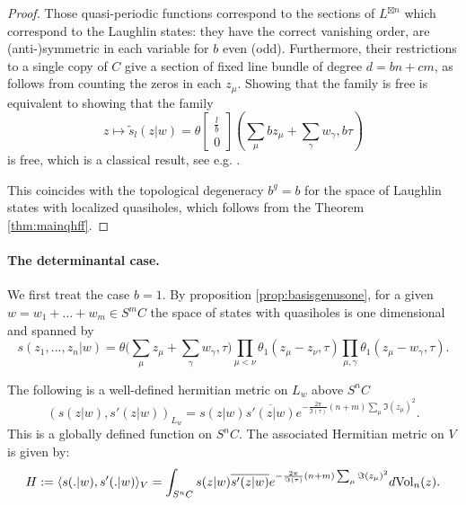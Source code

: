 \documentclass{article}
\theoremstyle{definition}
\newcommand{\chara}[2]{\begin{bmatrix} #1 \\ #2 \end{bmatrix}}
\newcommand{\ov}[1]{\overline{#1}}
\begin{document}
\begin{proof}
Those quasi-periodic functions correspond to the sections of $L^{\boxtimes n}$ which correspond to the Laughlin states: they have the correct vanishing order, are (anti-)symmetric in each variable for $b$ even (odd). Furthermore, their restrictions to a single copy of $C$ give a section of fixed line bundle of degree $d=bn+cm$, as follows from counting the zeros in each $z_\mu$. 
Showing that the family is free is equivalent to showing that the family 
\begin{equation}
    \label{eq:stilde}
z \mapsto \tilde{s}_{l}(z|w)=\theta \chara{\frac{l}{b}}{0} \left(\sum_\mu b z_\mu + \sum_\gamma w_\gamma,b\tau\right)
\end{equation}
is free, which is a classical result, see e.g. \cite[Ch.2, Prop.1.3]{mumford1983tata}. 

This coincides with the topological degeneracy $b^g=b$ for the space of Laughlin states with localized quasiholes, which follows from the Theorem \ref{thm:mainqhff}.
\end{proof}


\paragraph{The determinantal case.}
We first treat the case $b=1$. By proposition \ref{prop:basisgenusone}, for a given $w=w_1+\dots+w_m\in S^m C$ the space of states with quasiholes is one dimensional and spanned by $$s\left(z_1,\dots,z_n|w\right)=\theta\bigg(\sum_\mu z_\mu + \sum_\gamma w_\gamma,\tau\bigg) \prod_{\mu<\nu} \theta_1(z_\mu - z_\nu,\tau) \prod_{\mu,\gamma}\theta_1(z_\mu-w_\gamma,\tau).$$ 


The following is a well-defined hermitian metric on $L_{w}$ above $S^n C$ 
$$(s(z|w),s'(z|w))_{L_w} = s(z|w) \ov{s'(z|w)} e^{-\frac{2\pi}{\Im(\tau)}(n+m)\sum_\mu \Im(z_\mu)^2}.$$
This is a globally defined function on $S^nC$. The associated Hermitian metric on $V$ is given by:
$$H:=\langle s(.|w),s'(.|w) \rangle_V = \int_{S^n C} s(z|w) \ov{s'(z|w)} e^{-\frac{2\pi}{\Im(\tau)}(n+m)\sum_\mu \Im(z_\mu)^2} d{\rm Vol}_n(z).$$
\end{document}
